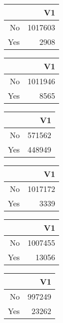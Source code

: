 \bigskip\bigskip
\centering
\begin{tabular}{rr}
  \hline
 & V1 \\ 
  \hline
No & 1017603 \\ 
  Yes & 2908 \\ 
   \hline
\end{tabular}

\bigskip\bigskip
\centering
\begin{tabular}{rr}
  \hline
 & V1 \\ 
  \hline
No & 1011946 \\ 
  Yes & 8565 \\ 
   \hline
\end{tabular}

\bigskip\bigskip
\centering
\begin{tabular}{rr}
  \hline
 & V1 \\ 
  \hline
No & 571562 \\ 
  Yes & 448949 \\ 
   \hline
\end{tabular}

\bigskip\bigskip
\centering
\begin{tabular}{rr}
  \hline
 & V1 \\ 
  \hline
No & 1017172 \\ 
  Yes & 3339 \\ 
   \hline
\end{tabular}

\bigskip\bigskip
\centering
\begin{tabular}{rr}
  \hline
 & V1 \\ 
  \hline
No & 1007455 \\ 
  Yes & 13056 \\ 
   \hline
\end{tabular}

\bigskip\bigskip
\centering
\begin{tabular}{rr}
  \hline
 & V1 \\ 
  \hline
No & 997249 \\ 
  Yes & 23262 \\ 
   \hline
\end{tabular}


